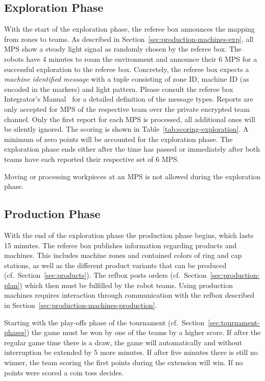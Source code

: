 \documentclass[12pt,twoside]{article}
\newcommand{\refsec}[1]{Section~\ref{#1}}
\newcommand{\reftab}[1]{Table~\ref{#1}}
\begin{document}
\subsection{Exploration Phase}
\label{sec:exploration-phase}
With the start of the exploration phase, the referee box announces the
mapping from zones to teams. As described in
\refsec{sec:production-machines-exp}, all MPS show a steady light
signal as randomly chosen by the referee box. The robots have 4
minutes to roam the environment and announce their 6 MPS for a
successful exploration to the referee box. Concretely, the referee box
expects a \emph{machine identified message} with a tuple consisting of
zone ID, machine ID (as encoded in the markers) and light
pattern. Please consult the referee box Integrator's
Manual~\cite{RefBoxIntManual} for a detailed definition of the message
types. Reports are only accepted for MPS of the respective team over
the private encrypted team channel. Only the first report for each MPS
is processed, all additional ones will be silently ignored. The
scoring is shown in \reftab{tab:scoring-exploration}. A minimum of
zero points will be accounted for the exploration phase. The
exploration phase ends either after the time has passed or immediately
after both teams have each reported their respective set of 6 MPS.

Moving or processing workpieces at an MPS is not allowed during the
exploration phase.

\subsection{Production Phase}
\label{sec:production-phase}
With the end of the exploration phase the production phase begins,
which lasts \num{15} minutes. The referee box publishes information
regarding products and machines. This includes machine zones and
contained colors of ring and cap stations, as well as the different
product variants that can be produced (cf.~\refsec{sec:products}). The
refbox posts orders (cf.~\refsec{sec:production-plan}) which then must
be fulfilled by the robot teams. Using production machines requires
interaction through communication with the refbox described in
\refsec{sec:production-machines-production}.

Starting with the play-offs phase of the tournament
(cf.~\refsec{sec:tournament-phases}) the game must be won by one of
the teams by a higher score. If after the regular game time there is a
draw, the game will automatically and without interruption be extended
by 5 more minutes. If after five minutes there is still no winner, the
team scoring the first points during the extension will win. If no points were scored a
coin toss decides.
\end{document}

